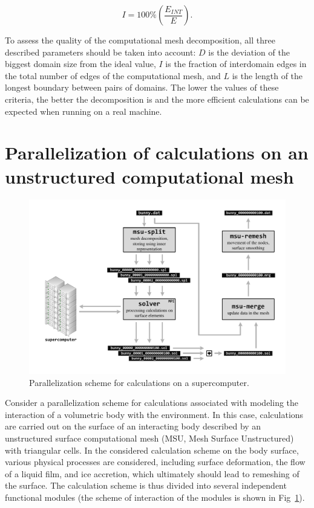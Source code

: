 \documentclass[
11pt,%
tightenlines,%
twoside,%
onecolumn,%
nofloats,%
nobibnotes,%
nofootinbib,%
superscriptaddress,%
noshowpacs,%
centertags]%
{revtex4}
\begin{document}
\begin{equation}
I = 100 \% \left( \frac{E_{INT}}{E} \right).
\end{equation}

To assess the quality of the computational mesh decomposition, all three described parameters should be taken into account: $ D $ is the deviation of the biggest domain size from the ideal value, $ I $ is the fraction of interdomain edges in the total number of edges of the computational mesh, and $ L $ is the length of the longest boundary between pairs of domains.
The lower the values of these criteria, the better the decomposition is and the more efficient calculations can be expected when running on a real machine.

\section{Parallelization of calculations on an unstructured computational mesh}

\begin{figure}[h]
\includegraphics[width=1.0\textwidth]{pics/02-scheme.pdf}
\caption{Parallelization scheme for calculations on a supercomputer.}\label{fig:02-scheme}
\end{figure}

Consider a parallelization scheme for calculations associated with modeling the interaction of a volumetric body with the environment.
In this case, calculations are carried out on the surface of an interacting body described by an unstructured surface computational mesh (MSU, Mesh Surface Unstructured) with triangular cells.
In the considered calculation scheme on the body surface, various physical processes are considered, including surface deformation, the flow of a liquid film, and ice accretion, which ultimately should lead to remeshing of the surface.
The calculation scheme is thus divided into several independent functional modules (the scheme of interaction of the modules is shown in Fig~\ref{fig:02-scheme}).
\end{document}

